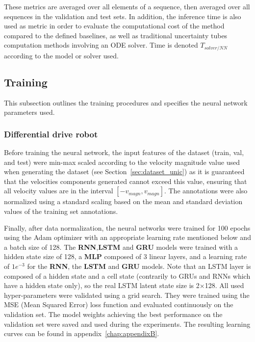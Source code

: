 These metrics are averaged over all elements of a sequence, then averaged over all sequences in the validation and test sets. 
In addition, the inference time is also used as metric in order to evaluate the computational cost of the method compared to the defined baselines, as well as traditional uncertainty tubes computation methods involving an ODE solver. 
Time is denoted $T_{solver/NN}$ according to the model or solver used.

\subsection{Training}

This subsection outlines the training procedures and specifies the neural network parameters used.

\subsubsection{Differential drive robot}

Before training the neural network, the input features of the dataset (train, val, and test) were min-max scaled according to the velocity magnitude value used when generating the dataset (see Section~\ref{sec:dataset_unic}) as it is guaranteed that the velocities components generated cannot exceed this value, ensuring that all velocity values are in the interval $[-v_{magn}, v_{magn}]$.  
The annotations were also normalized using a standard scaling based on the mean and standard deviation values of the training set annotations.

Finally, after data normalization, the neural networks were trained for 100 epochs using the Adam optimizer \cite{kingma2014adam} with an appropriate learning rate mentioned below and a batch size of 128. 
The \textbf{RNN},\textbf{LSTM} and \textbf{GRU} models were trained with a hidden state size of 128, a \textbf{MLP} composed of 3 linear layers, and a learning rate of $1e^{-3}$ for the \textbf{RNN}, the \textbf{LSTM} and \textbf{GRU} models.
Note that an LSTM layer is composed of a hidden state and a cell state (contrarily to GRUs and RNNs which have a hidden state only), so the real LSTM latent state size is 2$\times$128.
All used hyper-parameters were validated using a grid search.
They were trained using the MSE (Mean Squared Error) loss function and evaluated continuously on the validation set. 
The model weights achieving the best performance on the validation set were saved and used during the experiments.
The resulting learning curves can be found in appendix~\ref{chap:appendixB}.

